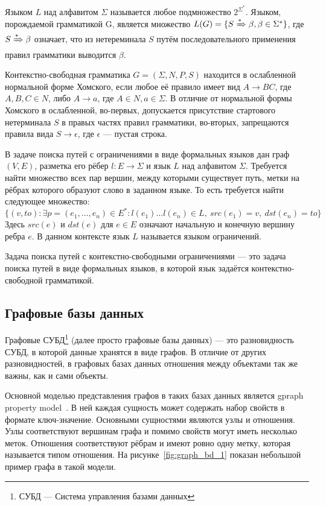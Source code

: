 \documentclass[14pt]{matmex-diploma-custom}
\newcommand{\gsv}[1]{\textcolor{red}{#1$^{\text{gsv}}$}}
\begin{document}
Языком $L$ над алфавитом $\Sigma$ называется любое подмножество $2^{\Sigma^*}$. Языком, порождаемой грамматикой G, является множество $L(G) = \{S \xRightarrow{*} \beta, \beta \in \Sigma^*\}$, где $S \xRightarrow{*} \beta$ означает, что из нетереминала $S$ путём последовательного применения правил грамматики выводится $\beta$.

Контекстно-свободная грамматика $G = (\Sigma, N, P, S)$ находится в осла\-бленной нормальной форме Хомского, если любое её правило имеет вид $A \rightarrow BC$, где $A, B, C \in N$, либо $A \rightarrow a$, где $A \in N, a \in \Sigma$. В отличие от нормальной формы Хомского в ослабленной, во-первых, допускается присутствие стартового нетерминала $S$ в правых частях правил грамматики, во-вторых, запрещаются правила вида $S \rightarrow \epsilon$, где $\epsilon$ --- пустая строка.


В задаче поиска путей с ограничениями в виде формальных языков дан граф $(V, E)$, разметка его рёбер $l: E \rightarrow \Sigma$ и язык $L$ над алфавитом $\Sigma$. Требуется найти множество всех пар вершин, между которыми существует путь, метки на рёбрах которого образуют слово в заданном языке. То есть требуется найти следующее множество:
\[\{(v, to): \exists p=(e_1,...,e_n) \in E^*: l(e_1)...l(e_n) \in L,~src(e_1)=v,~dst(e_n)=to\}\]
Здесь $src(e)$ и $dst(e)$ для $e \in E$ означают начальную и конечную вершину ребра $e$. В данном контексте язык $L$ называется языком ограничений.

Задача поиска путей с контекстно-свободными ограничениями --- это задача поиска путей в виде формальных языков, в которой язык задаётся контекстно-свободной грамматикой.

\subsection{Графовые базы данных}
Графовые СУБД\footnote{СУБД --- Система управления базами данных} (далее просто графовые базы данных) --- это разновидность СУБД, в которой данные хранятся в виде графов. В отличие от других разновидностей, в графовых базах данных отношения между объектами так же важны, как и сами объекты.

Основной моделью представления графов в таких базах данных является gpraph property model~\cite{graph-propery-model}. В ней каждая сущность может содержать набор свойств в формате ключ-значение. Основными сущностями являются узлы и отношения. Узлы соответствуют вершинам графа и помимо свойств могут иметь несколько меток. Отношения соответствуют рёбрам и имеют ровно одну метку, которая называется типом отношения. На рисунке~\ref{fig:graph_bd_1} показан небольшой пример графа в такой модели. 
\end{document}
